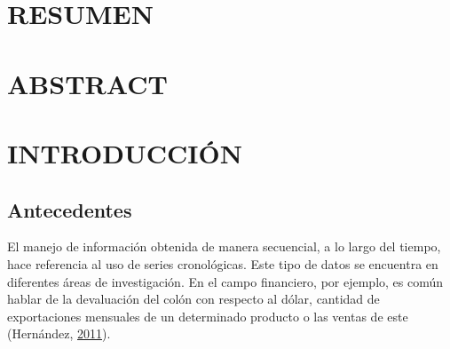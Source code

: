 \documentclass[
]{article}
\begin{document}
\cleardoublepage

\tableofcontents
\listoftables
\listoffigures

\cleardoublepage
{}

\newpage

\section*{RESUMEN}

\cleardoublepage

\section*{ABSTRACT}

\cleardoublepage

\section{INTRODUCCIÓN}

\subsection{Antecedentes}

El manejo de información obtenida de manera secuencial, a lo largo del
tiempo, hace referencia al uso de series cronológicas. Este tipo de
datos se encuentra en diferentes áreas de investigación. En el campo
financiero, por ejemplo, es común hablar de la devaluación del colón con
respecto al dólar, cantidad de exportaciones mensuales de un determinado
producto o las ventas de este (Hernández,
\protect\hyperlink{ref-oscarh-1}{2011}).
\end{document}
